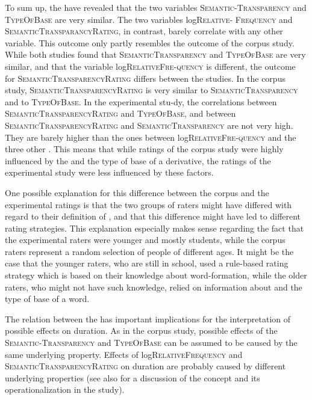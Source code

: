  
 To sum up, the  have revealed that the two variables \textsc{Semantic-Transparency} and \textsc{TypeOfBase} are very similar. The two variables log\textsc{Relative- Frequency} and \textsc{SemanticTransparancyRating}, in contrast, barely correlate with any other  variable.
This outcome only partly resembles the outcome of the corpus study. While both studies found that \textsc{SemanticTransparency} and \textsc{TypeOfBase} are very similar, and that the variable log\textsc{RelativeFre-quency} is different, the outcome for \textsc{SemanticTransparencyRating} differs between the studies. 
In the corpus study, \textsc{SemanticTransparencyRating} is very similar to \textsc{SemanticTransparency} and to \textsc{TypeOfBase}. In the experimental stu-dy, the correlations between \textsc{SemanticTransparencyRating} and \textsc{TypeOfBase}, and between \textsc{SemanticTransparencyRating}  and \textsc{SemanticTransparency} are not very high. They are barely higher than the ones between log\textsc{RelativeFre-quency} and the three other . 
This means that while ratings of the corpus study were highly influenced by the  and the type of base of a derivative, the ratings of the experimental study were less influenced by these factors.

 
 One possible explanation for this difference between the corpus and the experimental ratings is that the two groups of raters might have differed with regard to their definition of , and that this difference might have led to different rating strategies. This explanation especially makes sense regarding the fact that the experimental raters were younger and mostly students, while the corpus raters represent a random selection of people of different ages. It might be the case that the younger raters, who are still in school, used a rule-based rating strategy which is based on their knowledge about word-formation, while the older raters, who might not have such knowledge, relied on information about  and the type of base of a word. 

 The relation between the  has important implications for the interpretation of possible  effects on duration. As in the corpus study, possible effects of the  \textsc{Semantic-Transparency} and \textsc{TypeOfBase} can be assumed to be caused by the same underlying property. 
 Effects of log\textsc{RelativeFrequency} and \textsc{SemanticTransparencyRating} on duration are probably caused by different underlying properties (see also  for a discussion of the concept  and its operationalization in the study).
 





